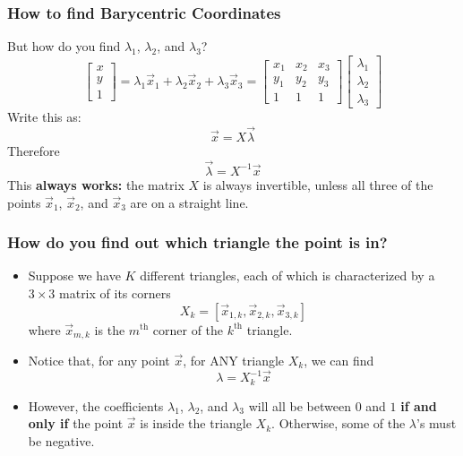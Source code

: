 \documentclass{beamer}
\begin{document}
\begin{frame}
  \frametitle{How to find Barycentric Coordinates}
  But how do you find $\lambda_1$, $\lambda_2$, and $\lambda_3$?
  \[
  \left[\begin{array}{c}x\\y\\1\end{array}\right]=
  \lambda_1\vec{x}_1+\lambda_2\vec{x}_2+\lambda_3\vec{x}_3
  =\left[\begin{array}{ccc}x_1&x_2&x_3\\y_1&y_2&y_3\\1&1&1\end{array}\right]
  \left[\begin{array}{c}\lambda_1\\\lambda_2\\\lambda_3\end{array}\right]
  \]
  Write this as:
  \[
  \vec{x}=X\vec\lambda
  \]
  Therefore
  \[
  \vec\lambda = X^{-1}\vec{x}
  \]
  This {\bf always works:} the matrix $X$ is always invertible, unless
  all three of the points $\vec{x}_1$, $\vec{x}_2$, and $\vec{x}_3$
  are on a straight line.
\end{frame}
\begin{frame}
  \frametitle{How do you find out which triangle
    the point is in?}
  \begin{itemize}
  \item Suppose we have $K$ different triangles, each of which is
    characterized by a $3\times 3$ matrix of its corners
    \[
    X_k = \left[\vec{x}_{1,k},\vec{x}_{2,k},\vec{x}_{3,k}\right]
    \]
    where $\vec{x}_{m,k}$ is the $m^{\textrm{th}}$ corner of the
    $k^{\textrm{th}}$ triangle.
  \item Notice that, for any point $\vec{x}$, for ANY triangle $X_k$,
    we can find
    \[\lambda = X_k^{-1}\vec{x}\]
  \item However, the coefficients $\lambda_1$, $\lambda_2$, and
    $\lambda_3$ will all be between $0$ and $1$ {\bf if and only if}
    the point $\vec{x}$ is inside the triangle $X_k$.  Otherwise, some
    of the $\lambda$'s must be negative.
  \end{itemize}
\end{frame}
\end{document}
